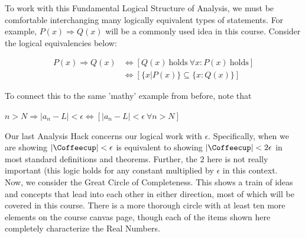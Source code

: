 \documentclass{article}
\begin{document}
To work with this Fundamental Logical Structure of Analysis, we must be comfortable interchanging many logically equivalent types of statements. For example, $P(x) \Longrightarrow Q(x)$ will be a commonly used idea in this course. Consider the logical equivalencies below:

\begin{align*}
    P(x) \Longrightarrow Q(x) &\Longleftrightarrow [Q(x) \ \text{holds} \ \forall x: P(x) \ \text{holds}]\\
    &\Longleftrightarrow [\{x|P(x)\} \subseteq \{x:Q(x)\}]
\end{align*}

To connect this to the same 'mathy' example from before, note that 

\begin{center}
    $n>N \Longrightarrow |a_n-L|<\epsilon \Longleftrightarrow [|a_n-L|<\epsilon \ \forall n>N]$
\end{center}

Our last Analysis Hack concerns our logical work with $\epsilon$. Specifically, when we are showing $|\text{\Coffeecup}|<\epsilon$ is equivalent to showing $|\text{\Coffeecup}|<2\epsilon$ in most standard definitions and theorems. Further, the $2$ here is not really important (this logic holds for any constant multiplied by $\epsilon$ in this context.\\

Now, we consider the Great Circle of Completeness. This shows a train of ideas and concepts that lead into each other in either direction, most of which will be covered in this course. There is a more thorough circle with at least ten more elements on the course canvas page, though each of the items shown here completely characterize the Real Numbers.\\

\end{document}
